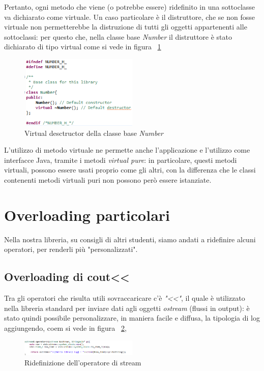 Pertanto, ogni metodo che viene (o potrebbe essere) ridefinito in una sottoclasse va dichiarato come virtuale.
Un caso particolare è il distruttore, che se non fosse virtuale non permetterebbe la distruzione di
tutti gli oggetti appartenenti alle sottoclassi: per questo che, nella classe base \textit{Number} il distruttore è stato dichiarato di tipo virtual come si vede in figura ~\ref{fig:VirtualDesctructor}

\begin{figure}[h]
	\centering
	\includegraphics[width=0.5\textwidth]{Immagini/VirtualDestructor.png}
	\caption{Virtual desctructor della classe base \textit{Number}}
	\label{fig:VirtualDesctructor}
\end{figure}

L'utilizzo di metodo virtuale ne permette anche l'applicazione e l'utilizzo come interfacce Java, tramite i metodi \textit{virtual pure}: in particolare, questi metodi virtuali, possono essere usati proprio come gli altri, con la differenza che le classi contenenti metodi virtuali puri non possono però essere istanziate.

\section{Overloading particolari}
Nella nostra libreria, su consigli di altri studenti, siamo andati a ridefinire alcuni operatori, per renderli più "personalizzati".
\subsection{Overloading di cout<<}
Tra gli operatori che risulta utili sovraccaricare c'è \textit{"<<"}, il quale è utilizzato nella libreria standard per inviare dati agli oggetti \textit{ostream} (flussi in output): è stato quindi possibile personalizzare, in maniera facile e diffusa, la tipologia di log aggiungendo, coem si vede in figura ~\ref{fig:CoutRedef}, 

\begin{figure}[h]
	\centering
	\includegraphics[width=0.5\textwidth]{Immagini/CoutRedefinition.png}
	\caption{Ridefinizione dell'operatore di stream}
	\label{fig:CoutRedef}
\end{figure}

